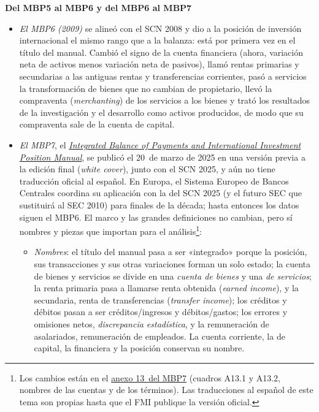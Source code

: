 \documentclass[11pt]{article}
\begin{document}
\begin{anotaciones}
\textbf{Del MBP5 al MBP6 y del MBP6 al MBP7}
\begin{itemize}
\item \emph{El MBP6 (2009)} se alineó con el SCN 2008 y dio a la posición de inversión internacional el mismo rango que a la balanza: está por primera vez en el título del manual. Cambió el signo de la cuenta financiera (ahora, variación neta de activos menos variación neta de pasivos), llamó rentas primarias y secundarias a las antiguas rentas y transferencias corrientes, pasó a servicios la transformación de bienes que no cambian de propietario, llevó la compraventa (\emph{merchanting}) de los servicios a los bienes y trató los resultados de la investigación y el desarrollo como activos producidos, de modo que su compraventa sale de la cuenta de capital\nocite{FMI2009MBP6}.
\item \emph{El MBP7}, el \href{https://www.imf.org/-/media/Files/Data/Statistics/BPM6/draft-bpm7-wcv.ashx}{\emph{Integrated Balance of Payments and International Investment Position Manual}}, se publicó el 20~de marzo de 2025 en una versión previa a la edición final (\emph{white cover}), junto con el SCN 2025, y aún no tiene traducción oficial al español. En Europa, el Sistema Europeo de Bancos Centrales coordina su aplicación con la del SCN 2025 (y el futuro SEC que sustituirá al SEC 2010) para finales de la década; hasta entonces los datos siguen el MBP6\nocite{FMI2025MBP7,FMI2025BPM7,BCE2026CalidadBP}. El marco y las grandes definiciones no cambian, pero sí nombres y piezas que importan para el análisis\nocite{FMI2025MBP7Cambios}\footnote{Los cambios están en el \href{https://www.imf.org/-/media/Files/Data/Statistics/BPM6/draft-bpm7-wcv.ashx}{anexo 13~del MBP7} (cuadros A13.1 y A13.2, nombres de las cuentas y de los términos). Las traducciones al español de este tema son propias hasta que el FMI publique la versión oficial.}:
  \begin{itemize}
  \item \emph{Nombres}: el título del manual pasa a ser «integrado» porque la posición, sus transacciones y sus otras variaciones forman un solo estado; la cuenta de bienes y servicios se divide en una \emph{cuenta de bienes} y una \emph{de servicios}; la renta primaria pasa a llamarse renta obtenida (\emph{earned income}), y la secundaria, renta de transferencias (\emph{transfer income}); los créditos y débitos pasan a ser créditos/ingresos y débitos/gastos; los errores y omisiones netos, \emph{discrepancia estadística}, y la remuneración de asalariados, remuneración de empleados. La cuenta corriente, la de capital, la financiera y la posición conservan su nombre.

\end{itemize}
\end{itemize}
\end{anotaciones}
\end{document}

